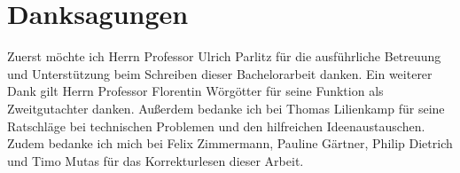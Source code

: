 \chapter*{Danksagungen}
Zuerst möchte ich Herrn Professor Ulrich Parlitz für die ausführliche Betreuung und Unterstützung beim Schreiben dieser Bachelorarbeit danken. Ein weiterer Dank gilt Herrn Professor Florentin Wörgötter für seine Funktion als Zweitgutachter danken. Außerdem bedanke ich bei Thomas Lilienkamp für seine Ratschläge bei technischen Problemen und den hilfreichen Ideenaustauschen. Zudem bedanke ich mich bei Felix Zimmermann, Pauline Gärtner, Philip Dietrich und Timo Mutas für das Korrekturlesen dieser Arbeit. 